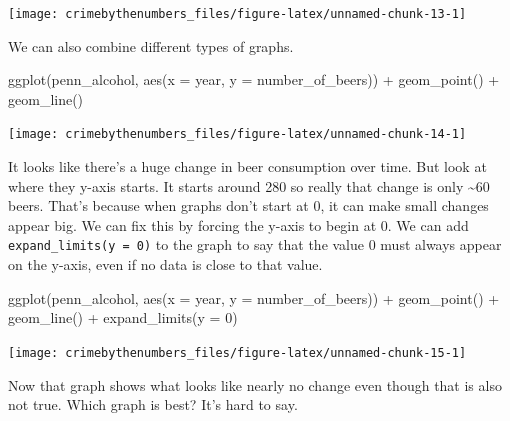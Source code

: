 \documentclass[
]{krantz}
\makeatletter
\newenvironment{Shaded}{\begin{snugshade}}{\end{snugshade}}
\newcommand{\AttributeTok}[1]{\textcolor[rgb]{0.61,0.61,0.61}{#1}}
\newcommand{\DecValTok}[1]{\textcolor[rgb]{0.06,0.06,0.06}{#1}}
\newcommand{\FunctionTok}[1]{\textcolor[rgb]{0,0,0}{#1}}
\newcommand{\NormalTok}[1]{#1}
\newcommand{\SpecialCharTok}[1]{\textcolor[rgb]{0,0,0}{#1}}
\newenvironment{kframe}{%
\medskip{}
\setlength{\fboxsep}{.8em}
 \def\at@end@of@kframe{}%
 \ifinner\ifhmode%
  \def\at@end@of@kframe{\end{minipage}}%
  \begin{minipage}{\columnwidth}%
 \fi\fi%
 \def\FrameCommand##1{\hskip\@totalleftmargin \hskip-\fboxsep
 \colorbox{shadecolor}{##1}\hskip-\fboxsep
     \hskip-\linewidth \hskip-\@totalleftmargin \hskip\columnwidth}%
 \MakeFramed {\advance\hsize-\width
   \@totalleftmargin\z@ \linewidth\hsize
   \@setminipage}}%
 {\par\unskip\endMakeFramed%
 \at@end@of@kframe}
\renewenvironment{Shaded}{\begin{kframe}}{\end{kframe}}
\makeatother
\begin{document}
\begin{center}\texttt{[image: crimebythenumbers\_files/figure-latex/unnamed-chunk-13-1]} \end{center}

We can also combine different types of graphs.

\begin{Shaded}
\begin{Highlighting}[]
\FunctionTok{ggplot}\NormalTok{(penn\_alcohol, }\FunctionTok{aes}\NormalTok{(}\AttributeTok{x =}\NormalTok{ year, }\AttributeTok{y =}\NormalTok{ number\_of\_beers)) }\SpecialCharTok{+}
  \FunctionTok{geom\_point}\NormalTok{() }\SpecialCharTok{+}
  \FunctionTok{geom\_line}\NormalTok{()}
\end{Highlighting}
\end{Shaded}

\begin{center}\texttt{[image: crimebythenumbers\_files/figure-latex/unnamed-chunk-14-1]} \end{center}

It looks like there's a huge change in beer consumption over time. But look at where they y-axis starts. It starts around 280 so really that change is only \textasciitilde60 beers. That's because when graphs don't start at 0, it can make small changes appear big. We can fix this by forcing the y-axis to begin at 0. We can add \texttt{expand\_limits(y\ =\ 0)} to the graph to say that the value 0 must always appear on the y-axis, even if no data is close to that value.

\begin{Shaded}
\begin{Highlighting}[]
\FunctionTok{ggplot}\NormalTok{(penn\_alcohol, }\FunctionTok{aes}\NormalTok{(}\AttributeTok{x =}\NormalTok{ year, }\AttributeTok{y =}\NormalTok{ number\_of\_beers)) }\SpecialCharTok{+}
  \FunctionTok{geom\_point}\NormalTok{() }\SpecialCharTok{+}
  \FunctionTok{geom\_line}\NormalTok{() }\SpecialCharTok{+}
  \FunctionTok{expand\_limits}\NormalTok{(}\AttributeTok{y =} \DecValTok{0}\NormalTok{)}
\end{Highlighting}
\end{Shaded}

\begin{center}\texttt{[image: crimebythenumbers\_files/figure-latex/unnamed-chunk-15-1]} \end{center}

Now that graph shows what looks like nearly no change even though that is also not true. Which graph is best? It's hard to say.
\end{document}
